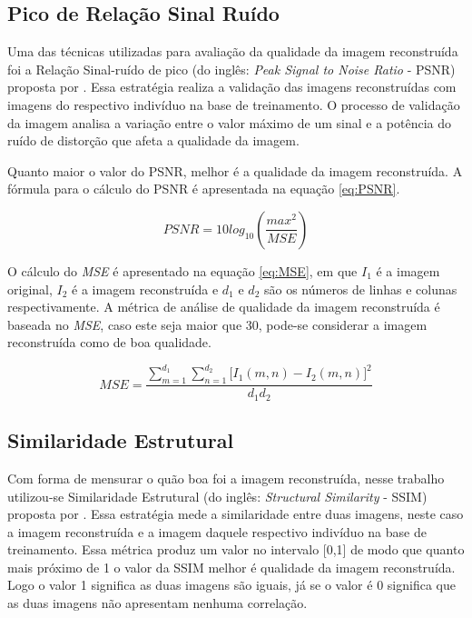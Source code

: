 \subsection{Pico de Relação Sinal Ruído}

Uma das técnicas utilizadas para avaliação da qualidade da imagem reconstruída foi a Relação Sinal-ruído de pico (do inglês: \textit{Peak Signal to Noise Ratio} - PSNR)  proposta por \cite{ashin2005image}. Essa estratégia realiza a validação das imagens reconstruídas com imagens do respectivo indivíduo na base de treinamento. O processo de validação da imagem analisa a variação entre o valor máximo de um sinal e a potência do ruído de distorção que afeta a qualidade da imagem. 


Quanto maior o valor do PSNR, melhor é a qualidade da imagem reconstruída. A fórmula para o cálculo do PSNR é apresentada na equação \ref{eq:PSNR}.

\begin{equation}
PSNR = 10log_{10}(\frac{max^{2}}{MSE})
\label{eq:PSNR}
\end{equation}

 O cálculo do \textit{MSE} é apresentado na equação \ref{eq:MSE}, em que $I_1$ é a imagem original, $I_2$ é a imagem reconstruída e $d_1$ e $d_2$ são os números de linhas e colunas respectivamente. A métrica de análise  de qualidade da imagem reconstruída é baseada no \textit{MSE}, caso este seja maior que 30, pode-se considerar a imagem reconstruída como de boa qualidade.

\begin{equation}
MSE = \frac{\sum _{m=1}^{d_1} \sum _{n=1}^{d_2} \Big[I_1(m,n) - I_2(m,n) \Big]^2  } {d_1d_2}
\label{eq:MSE}
\end{equation}




\subsection{Similaridade Estrutural}
\label{sub:ssim}
Com forma de mensurar o quão boa foi a imagem reconstruída, nesse trabalho utilizou-se Similaridade Estrutural (do inglês: \textit{Structural Similarity} - SSIM) proposta por \cite{ssim2004}. Essa estratégia mede a similaridade entre duas imagens, neste caso a imagem reconstruída e a imagem daquele respectivo indivíduo na base de treinamento. Essa métrica produz um valor no intervalo [0,1] de modo que quanto mais próximo de 1 o valor da SSIM melhor é qualidade da imagem reconstruída. Logo o valor 1 significa as duas imagens são iguais, já se o valor é 0 significa que as duas imagens não apresentam nenhuma correlação.

